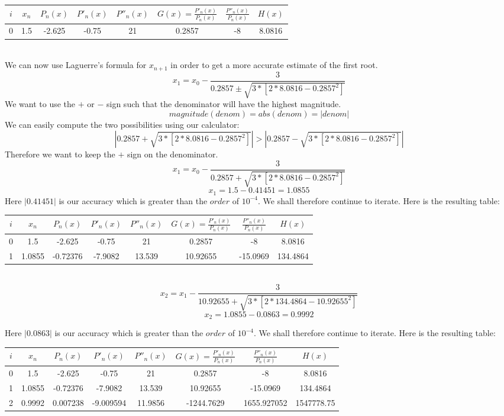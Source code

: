 \documentclass[12pt]{article}
\begin{document}
\begin{tabular}{|c|c|c|c|c|c|c|c|}
  \hline
  $i$ & $x_n$ & $P_n(x)$ & $P'_n(x)$ & $P''_n(x)$ & $G(x)=\frac{ P'_n(x) }{ P_n(x) }$ & $\frac{ P''_n(x) }{ P_n(x) }$ & $H(x)$ \\ \hline
  0 & 1.5 & -2.625 & -0.75 & 21 & 0.2857 & -8 & 8.0816 \\ \hline
\end{tabular} \\

We can now use Laguerre's formula for $x_{n+1}$ in order to get a more accurate estimate of the first root.
$$ x_1 = x_0 - \frac{ 3 }{ 0.2857 \pm \sqrt{ 3 * [2 * 8.0816 - 0.2857^2] } } $$
We want to use the $+$ or $-$ sign such that the denominator will have the highest magnitude.
$$ magnitude(denom) = abs(denom) = |denom| $$
We can easily compute the two possibilities using our calculator:
$$ | 0.2857 + \sqrt{ 3 * [2 * 8.0816 - 0.2857^2] } | > | 0.2857 - \sqrt{ 3 * [2 * 8.0816 - 0.2857^2] } | $$
Therefore we want to keep the $+$ sign on the denominator.
$$ x_1 = x_0 - \frac{ 3 }{ 0.2857 + \sqrt{ 3 * [2 * 8.0816 - 0.2857^2] } } $$
$$ x_1 = 1.5 - 0.41451 = 1.0855 $$
Here $|0.41451|$ is our accuracy which is greater than the $order$ of $10^{-4}$. We shall therefore continue to iterate. Here is the resulting table:

\begin{tabular}{|c|c|c|c|c|c|c|c|}
  \hline
  $i$ & $x_n$ & $P_n(x)$ & $P'_n(x)$ & $P''_n(x)$ & $G(x)=\frac{ P'_n(x) }{ P_n(x) }$ & $\frac{ P''_n(x) }{ P_n(x) }$ & $H(x)$ \\ \hline
  0 & 1.5 & -2.625 & -0.75 & 21 & 0.2857 & -8 & 8.0816 \\ \hline
  1 & 1.0855 & -0.72376 & -7.9082 & 13.539 & 10.92655 & -15.0969 & 134.4864 \\ \hline
\end{tabular} \\

$$ x_2 = x_1 - \frac{ 3 }{ 10.92655 + \sqrt{ 3 * [2 * 134.4864 - 10.92655^2] } } $$
$$ x_2 = 1.0855 - 0.0863 = 0.9992 $$

Here $|0.0863|$ is our accuracy which is greater than the $order$ of $10^{-4}$. We shall therefore continue to iterate. Here is the resulting table:

\begin{tabular}{|c|c|c|c|c|c|c|c|}
  \hline
  $i$ & $x_n$ & $P_n(x)$ & $P'_n(x)$ & $P''_n(x)$ & $G(x)=\frac{ P'_n(x) }{ P_n(x) }$ & $\frac{ P''_n(x) }{ P_n(x) }$ & $H(x)$ \\ \hline
  0 & 1.5 & -2.625 & -0.75 & 21 & 0.2857 & -8 & 8.0816 \\ \hline
  1 & 1.0855 & -0.72376 & -7.9082 & 13.539 & 10.92655 & -15.0969 & 134.4864 \\ \hline
  2 & 0.9992 & 0.007238 & -9.009594 & 11.9856 & -1244.7629 & 1655.927052 & 1547778.75 \\ \hline
\end{tabular} \\
\end{document}
